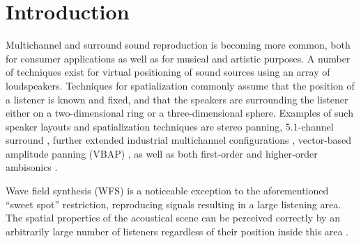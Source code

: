 \documentclass[twoside,10pt]{article}
\title{\papertitle}
\begin{document}
    
\maketitle




%
%




\begin{abstract}
The abstract should be placed at the top left column and should contain
about 150 words.
\end{abstract}








%
%


\section{Introduction}\label{sec:introduction}

Multichannel and surround sound reproduction is becoming more common, both for consumer applications as well as for musical and artistic purposes. A number of techniques exist for virtual positioning of sound sources using an array of loudspeakers.  Techniques for spatialization commonly assume that the position of a listener is known and fixed, and that the speakers are surrounding the listener either on a two-dimensional ring or a three-dimensional sphere. Examples of such speaker layouts and spatialization techniques are stereo panning, 5.1-channel surround \cite{ITU:1993_surround_5:1}, further extended industrial multichannel configurations \cite{Rumsey:2001spatial_audio}, vector-based amplitude panning (VBAP) \cite{Pulkki:1997vbap}, as well as both first-order and higher-order ambisonics \cite{Gerzon:1974surround, Poletti:2000holographic_sound}.

Wave field synthesis (WFS) is a noticeable exception to the aforementioned ``sweet spot'' restriction, reproducing signals resulting in a large listening area. The spatial properties of the acoustical scene can be perceived correctly by an arbitrarily large number of listeners regardless of their position inside this area \cite{Spors:2004sound_field_synthesis}.
\end{document}
